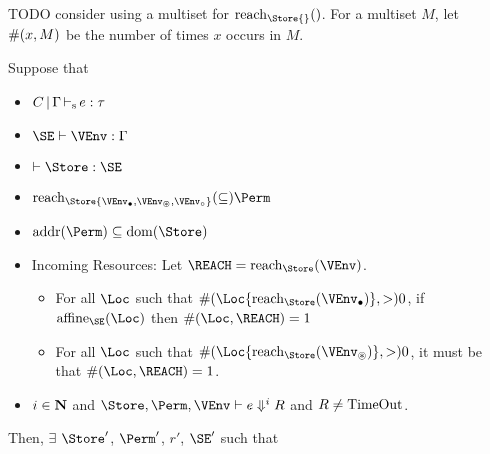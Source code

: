 TODO consider using a multiset for $\Reach\Store{}$. For a multiset
$M$, let $\#(x,M)$ be the number of times $x$ occurs in $M$.
\clearpage{}
\begin{theorem}
  Suppose that
  \begin{itemize}
  \item $C \operatorname{|} \Gamma \operatorname{\vdash_s} e : \tau$
  \item $\SE \vdash \VEnv : \E$
  \item $\vdash \Store : \SE$
  \item $\Reach\Store{\Active\VEnv, \MutableBorrows\VEnv, \ImmutableBorrows\VEnv} \subseteq \Perm$
  \item $\Addresses\Perm \subseteq \Dom\Store$
  \item Incoming Resources: Let $\REACH = \Reach\Store\VEnv$.
    \begin{itemize}
    \item 
      For all $\Loc$ such that $\MultiNumber\Loc{\Reach{\Store}{\Active\VEnv}} >0$,
      if $\Affine{\SE}\Loc$ then $\MultiNumber\Loc\REACH= 1$
    \item For all $\Loc$ such that $
      \MultiNumber\Loc{\Reach{\Store}{\MutableBorrows\VEnv}} >0$, it
      must be that $\MultiNumber\Loc\REACH=1$.
    \end{itemize}
  \item  $i\in\mathbf{N}$ and $\Store, \Perm, \VEnv \vdash {e}
    \Downarrow^i R$ and $R\ne \operatorname{TimeOut}$.
  \end{itemize}
  Then,
  $\exists$ $\Store'$, $\Perm'$, $r'$, $\SE'$ such that
\end{theorem}
